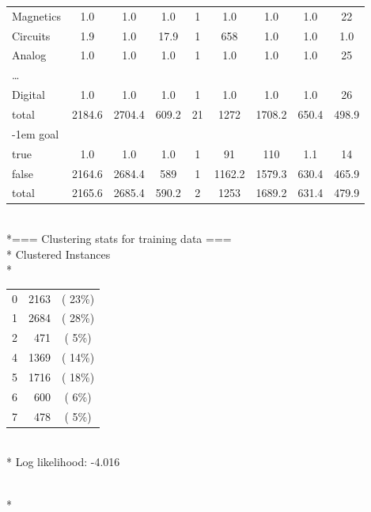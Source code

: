 \begin{tt}
\begin{footnotesize}
\begin{tabular}{lcccccccc}
Magnetics&1.0&1.0&1.0&1&1.0&1.0&1.0&22\\
Circuits&1.9&1.0&17.9&1&658&1.0&1.0&1.0\\
Analog&1.0&1.0&1.0&1&1.0&1.0&1.0&25\\ 
\ldots&&&&&&&&\\
Digital&1.0&1.0&1.0&1&1.0&1.0&1.0&26\\
total&2184.6&2704.4&609.2&21&1272&1708.2&650.4&498.9\\
\kern-1em goal\\ 
true&1.0&1.0&1.0&1&91&110&1.1&14\\
false&2164.6&2684.4&589&1&1162.2&1579.3&630.4&465.9\\ 
total&2165.6&2685.4&590.2&2&1253&1689.2&631.4&479.9\\
\end{tabular}
\\*=== Clustering stats for training data ===\\*
Clustered Instances\\*
\begin{tabular}{lrc} 
0&2163&( 23\%)\\*
1&2684&( 28\%)\\*
2&471&(  5\%)\\*
4&1369&( 14\%)\\*
5&1716&( 18\%)\\*
6&600&(  6\%)\\*
7&478&(  5\%)\\*
\end{tabular}
\\*
\noindent Log likelihood: -4.016
\end{footnotesize}
\end{tt}\\*

\vspace*{-13mm}
